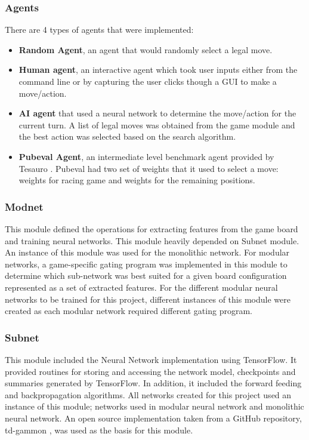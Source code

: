 \documentclass[12pt,a4paper]{article}
\begin{document}
\subsubsection{Agents}
There are 4 types of agents that were implemented: 
\begin{itemize}
    \item \textbf{Random Agent}, an agent that would randomly select a legal move. 
    \item \textbf{Human agent}, an interactive agent which took user inputs either from the command line or by capturing the user clicks though a GUI to make a move/action.
    \item \textbf{AI agent} that used a neural network to determine the move/action for the current turn. A list of legal moves was obtained from the game module and the best action was selected based on the search algorithm.
    \item \textbf{Pubeval Agent}, an intermediate level benchmark agent provided by Tesauro \citeyear{pubeval}. Pubeval had two set of weights that it used to select a move: weights for racing game and weights for the remaining positions.
\end{itemize}

\subsubsection{Modnet}
This module defined the operations for extracting features from the game board and training neural networks. This module heavily depended on Subnet module. An instance of this module was used for the monolithic network. For modular networks, a game-specific gating program was implemented in this module to determine which sub-network was best suited for a given board configuration represented as a set of extracted features. For the different modular neural networks to be trained for this project, different instances of this module were created as each modular network required different gating program.

\subsubsection{Subnet}
This module included the Neural Network implementation using TensorFlow. It provided routines for storing and accessing the network model, checkpoints and summaries generated by TensorFlow. In addition, it included the forward feeding and backpropagation algorithms. All networks created for this project used an instance of this module; networks used in modular neural network and monolithic neural network. An open source implementation taken from a GitHub repository, td-gammon \cite{fomorians}, was used as the basis for this module. 
\end{document}
